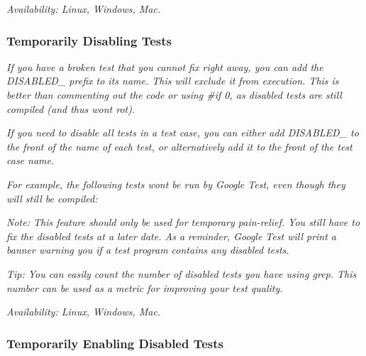 {\itshape {\itshape Availability\+:} Linux, Windows, Mac.}

{\itshape \subsubsection*{Temporarily Disabling Tests}}

{\itshape }

{\itshape If you have a broken test that you cannot fix right away, you can add the {\ttfamily D\+I\+S\+A\+B\+L\+E\+D\+\_\+} prefix to its name. This will exclude it from execution. This is better than commenting out the code or using {\ttfamily \#if 0}, as disabled tests are still compiled (and thus won\textquotesingle{}t rot).}

{\itshape If you need to disable all tests in a test case, you can either add {\ttfamily D\+I\+S\+A\+B\+L\+E\+D\+\_\+} to the front of the name of each test, or alternatively add it to the front of the test case name.}

{\itshape For example, the following tests won\textquotesingle{}t be run by Google Test, even though they will still be compiled\+:}

{\itshape 
\begin{DoxyCode}{0}
\DoxyCodeLine{}
\DoxyCodeLine{}
\end{DoxyCode}
}

{\itshape {\itshape Note\+:} This feature should only be used for temporary pain-\/relief. You still have to fix the disabled tests at a later date. As a reminder, Google Test will print a banner warning you if a test program contains any disabled tests.}

{\itshape {\itshape Tip\+:} You can easily count the number of disabled tests you have using {\ttfamily grep}. This number can be used as a metric for improving your test quality.}

{\itshape {\itshape Availability\+:} Linux, Windows, Mac.}

{\itshape \subsubsection*{Temporarily Enabling Disabled Tests}}

{\itshape }

